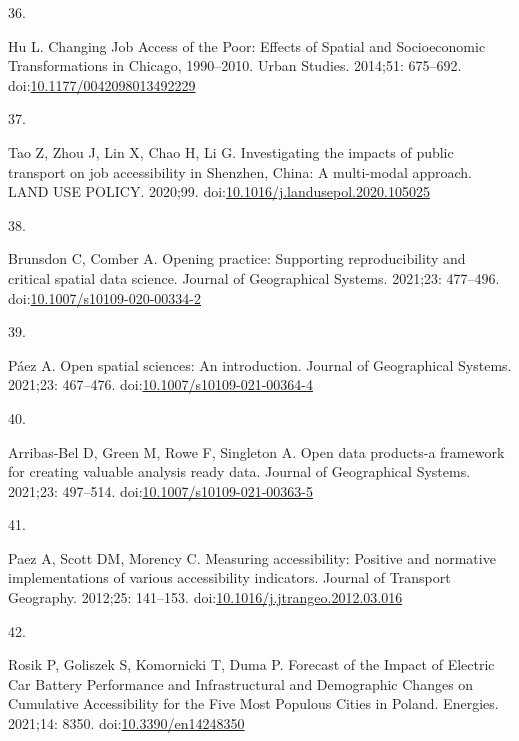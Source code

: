 \documentclass[10pt,letterpaper]{article}
\newlength{\cslhangindent}
\newlength{\csllabelwidth}
\newlength{\cslentryspacingunit} %
\newenvironment{CSLReferences}[2] %
 {%
  \setlength{\parindent}{0pt}
  \ifodd #1
  \let\oldpar\par
  \def\par{\hangindent=\cslhangindent\oldpar}
  \fi
  \setlength{\parskip}{#2\cslentryspacingunit}
 }%
 {}
\newcommand{\CSLLeftMargin}[1]{\parbox[t]{\csllabelwidth}{#1}}
\newcommand{\CSLRightInline}[1]{\parbox[t]{\linewidth - \csllabelwidth}{#1}\break}
\begin{document}
\begin{CSLReferences}{0}{0}
\leavevmode{}%
\CSLLeftMargin{36. }%
\CSLRightInline{Hu L. Changing {Job} {Access} of the {Poor}: {Effects}
of {Spatial} and {Socioeconomic} {Transformations} in {Chicago},
1990--2010. Urban Studies. 2014;51: 675--692.
doi:\href{https://doi.org/10.1177/0042098013492229}{10.1177/0042098013492229}}

\leavevmode{}%
\CSLLeftMargin{37. }%
\CSLRightInline{Tao Z, Zhou J, Lin X, Chao H, Li G. Investigating the
impacts of public transport on job accessibility in {Shenzhen}, {China}:
A multi-modal approach. LAND USE POLICY. 2020;99.
doi:\href{https://doi.org/10.1016/j.landusepol.2020.105025}{10.1016/j.landusepol.2020.105025}}

\leavevmode{}%
\CSLLeftMargin{38. }%
\CSLRightInline{Brunsdon C, Comber A. Opening practice: Supporting
reproducibility and critical spatial data science. Journal of
Geographical Systems. 2021;23: 477--496.
doi:\href{https://doi.org/10.1007/s10109-020-00334-2}{10.1007/s10109-020-00334-2}}

\leavevmode{}%
\CSLLeftMargin{39. }%
\CSLRightInline{Páez A. Open spatial sciences: An introduction. Journal
of Geographical Systems. 2021;23: 467--476.
doi:\href{https://doi.org/10.1007/s10109-021-00364-4}{10.1007/s10109-021-00364-4}}

\leavevmode{}%
\CSLLeftMargin{40. }%
\CSLRightInline{Arribas-Bel D, Green M, Rowe F, Singleton A. Open data
products-a framework for creating valuable analysis ready data. Journal
of Geographical Systems. 2021;23: 497--514.
doi:\href{https://doi.org/10.1007/s10109-021-00363-5}{10.1007/s10109-021-00363-5}}

\leavevmode{}%
\CSLLeftMargin{41. }%
\CSLRightInline{Paez A, Scott DM, Morency C. Measuring accessibility:
Positive and normative implementations of various accessibility
indicators. Journal of Transport Geography. 2012;25: 141--153.
doi:\href{https://doi.org/10.1016/j.jtrangeo.2012.03.016}{10.1016/j.jtrangeo.2012.03.016}}

\leavevmode{}%
\CSLLeftMargin{42. }%
\CSLRightInline{Rosik P, Goliszek S, Komornicki T, Duma P. Forecast of
the {Impact} of {Electric} {Car} {Battery} {Performance} and
{Infrastructural} and {Demographic} {Changes} on {Cumulative}
{Accessibility} for the {Five} {Most} {Populous} {Cities} in {Poland}.
Energies. 2021;14: 8350.
doi:\href{https://doi.org/10.3390/en14248350}{10.3390/en14248350}}


\end{CSLReferences}
\end{document}
